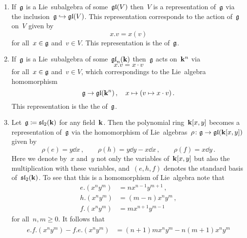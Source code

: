 \begin{examples}
  \label{examples for representations}
  \leavevmode
  \begin{enumerate}
    \item 
      If~$\mathfrak{g}$ is a Lie~subalgebra of some~$\mathfrak{gl}(V)$ then~$V$ is a representation of~$\mathfrak{g}$ via the inclusion~$\mathfrak{g} \hookrightarrow \mathfrak{gl}(V)$.
      This representation corresponds to the action of~$\mathfrak{g}$ on~$V$ given by
      \[
        x.v
        =
        x(v)
      \]
      for all~$x \in \mathfrak{g}$ and~$v \in V$.
      This representation is the  of~$\mathfrak{g}$.
    \item
      If~$\mathfrak{g}$ is a Lie~subalgebra of some~$\mathfrak{gl}_n(\mathbf{k})$ then~$\mathfrak{g}$ acts on~$\mathbf{k}^n$ via
      \[
        x.v
        =
        x \cdot v
      \]
      for all~$x \in \mathfrak{g}$ and~$v \in V$, which correspondings to the Lie~algebra homomorphism
      \[
        \mathfrak{g}
        \to
        \mathfrak{gl}(\mathbf{k}^n) \,,
        \quad
        x
        \mapsto
        (v \mapsto x \cdot v) \,.
      \]
      This representation is the the  of~$\mathfrak{g}$.
    \item
      Let~$\mathfrak{g} \coloneqq \mathfrak{sl}_2(\mathbf{k})$ for any field~$\mathbf{k}$.
      Then the polynomial ring~$\mathbf{k}[x,y]$ becomes a representation of~$\mathfrak{g}$ via the homomorphism of Lie~algebras~$\rho \colon \mathfrak{g} \to \mathfrak{gl}(\mathbf{k}[x,y])$ given by
      \[
        \rho(e) = y \dd{x} \,,
        \qquad
        \rho(h) = y \dd{y} - x \dd{x} \,,
        \qquad
        \rho(f) = x \dd{y}  \,.
      \]
      Here we denote by~$x$ and~$y$ not only the variables of~$\mathbf{k}[x,y]$ but also the multiplication with these variables, and~$(e,h,f)$ denotes the standard basis of~$\mathfrak{sl}_2(\mathbf{k})$.
      To see that this is a homomorphism of Lie~algebra note that
      \begin{align*}
        e.(x^n y^m)
        &=
        n x^{n-1} y^{m+1} \,, \\
        h.(x^n y^m)
        &=
        (m-n) x^n y^m \,, \\
        f.(x^n y^m)
        &=
        m x^{n+1} y^{m-1}
      \end{align*}
      for all~$n, m \geq 0$.
      It follows that
      \begin{gather*}
        \begin{aligned}
        e.f.(x^n y^m) - f.e.(x^n y^m)
        &=
        (n+1)m x^n y^m - n(m+1) x^n y^m
        \\

\end{aligned}
\end{gather*}
\end{enumerate}
\end{examples}
